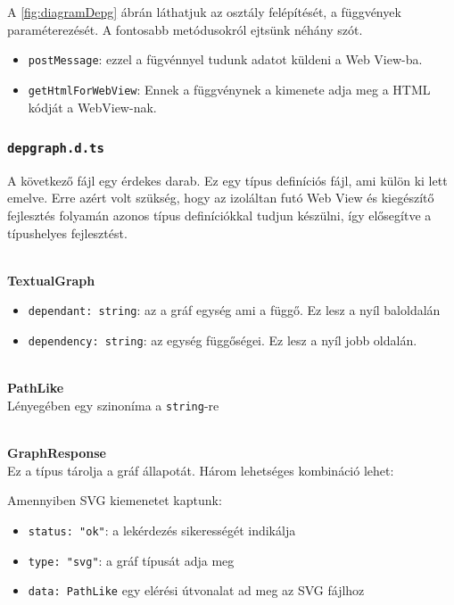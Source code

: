 A \ref{fig:diagramDepg} ábrán láthatjuk az osztály felépítését, a függvények paraméterezését. A fontosabb metódusokról ejtsünk néhány szót.

\begin{itemize}
    \item \lstinline{postMessage}: ezzel a fügvénnyel tudunk adatot küldeni a Web View-ba.
    \item \lstinline{getHtmlForWebView}: Ennek a függvénynek a kimenete adja meg a HTML kódját a WebView-nak.
\end{itemize}


\subsubsection{\lstinline{depgraph.d.ts}}

A következő fájl egy érdekes darab. Ez egy típus definíciós fájl, ami külön ki lett emelve. Erre azért volt szükség, hogy az izoláltan futó Web View és kiegészítő fejlesztés folyamán azonos típus definíciókkal tudjun készülni, így elősegítve a típushelyes fejlesztést.

\\
\vspace{14pt}
\textbf{TextualGraph}
\begin{itemize}
    \item \lstinline{dependant: string}: az a gráf egység ami a függő. Ez lesz a nyíl baloldalán
    \item \lstinline{dependency: string}: az egység függőségei. Ez lesz a nyíl jobb oldalán.
\end{itemize}


\\
\vspace{14pt}
\textbf{PathLike} 
\\
Lényegében egy szinoníma a \lstinline{string}-re


\\
\vspace{14pt}
\textbf{GraphResponse}
\\

Ez a típus tárolja a gráf állapotát. Három lehetséges kombináció lehet:

\noindent Amennyiben SVG kiemenetet kaptunk:
\begin{itemize}
    \item \lstinline{status: "ok"}: a lekérdezés sikerességét indikálja
    \item \lstinline{type: "svg"}: a gráf típusát adja meg
    \item \lstinline{data: PathLike} egy elérési útvonalat ad meg az SVG fájlhoz
\end{itemize}

